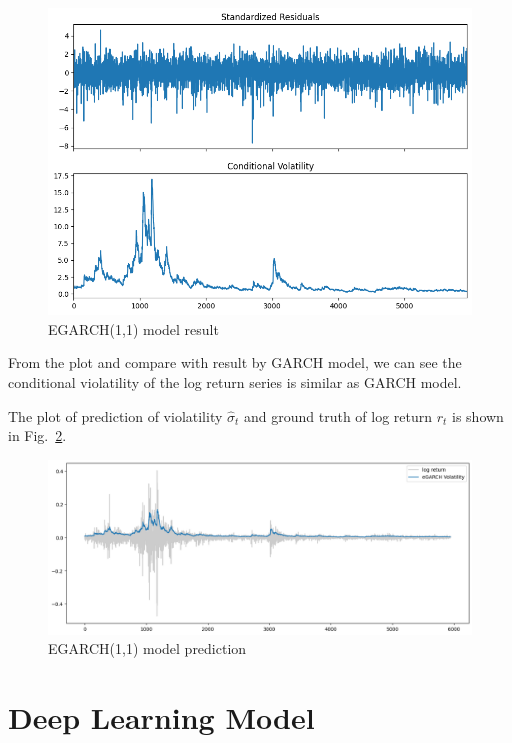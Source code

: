 \documentclass[runningheads]{llncs}
\begin{document}
\begin{figure}[htbp]
    \centering
    \includegraphics[width=\textwidth]{../img/egarch_result.png}
    \caption{EGARCH(1,1) model result}
    \label{fig:12}
\end{figure}

From the plot and compare with result by GARCH model, we can see the conditional violatility of the log return series is similar as GARCH model. 

The plot of prediction of violatility $\hat{\sigma}_t$ and ground truth of log return $r_t$ is shown in Fig.~\ref{fig:13}.


\begin{figure}[htbp]
    \centering
    \includegraphics[width=\textwidth]{../img/egarch_train_pred.png}
    \caption{EGARCH(1,1) model prediction}
    \label{fig:13}
\end{figure}

\section{Deep Learning Model}
\end{document}
